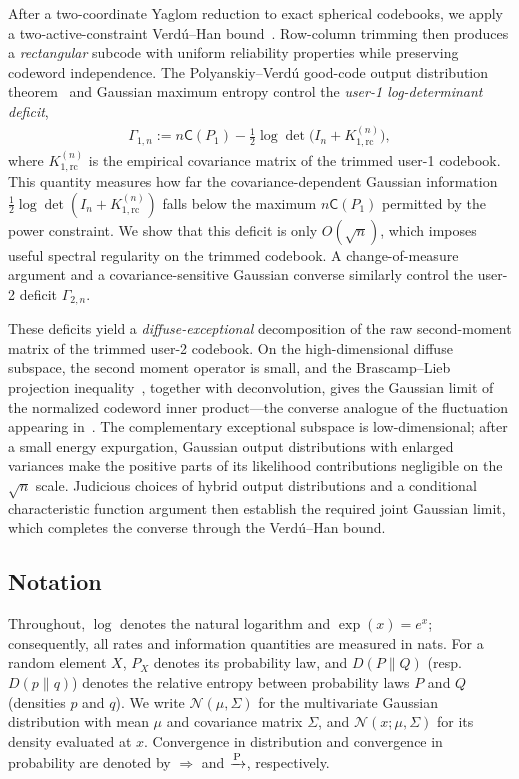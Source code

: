\documentclass[11pt,onecolumn]{IEEEtran}
\newcommand{\calN}{\mathcal{N}}
\newcommand{\rvC}{\mathsf{C}}
\newcommand{\rc}{\mathrm{rc}}
\begin{document}
After a two-coordinate Yaglom reduction to exact spherical codebooks, we
apply a two-active-constraint Verd\'u--Han bound~\cite{VH94,Han98}.
Row-column trimming then produces a {\em rectangular} subcode with uniform
reliability properties while preserving codeword independence. The
Polyanskiy--Verd\'u good-code output  distribution theorem~\cite{PolVerdu14} and Gaussian maximum entropy control the {\em user-1 log-determinant deficit}, \begin{align}
\Gamma_{1,n}
:=
n\rvC(P_1)
-\frac{1}{2}\log\det\bigl(I_n+K_{1,\rc}^{(n)}\bigr),
\end{align}
where \(K_{1,\rc}^{(n)}\) is the empirical covariance matrix of the trimmed
user-1 codebook. This quantity measures how far the covariance-dependent
Gaussian information
\(\frac12\log\det(I_n+K_{1,\rc}^{(n)})\) falls below the maximum
\(n\rvC(P_1)\) permitted by the power constraint. We show that this deficit
is only \(O(\sqrt n)\), which imposes useful spectral regularity on the
trimmed codebook. A change-of-measure
argument and a covariance-sensitive Gaussian converse similarly control the
user-2 deficit $\Gamma_{2,n}$. %

These deficits yield a {\em  diffuse-exceptional} decomposition of the raw
second-moment matrix of the trimmed user-2 codebook. On the high-dimensional
diffuse subspace, the second moment operator is small, and the
Brascamp--Lieb projection inequality~\cite{CarlenCorderoErausquin2009},
together with deconvolution, gives the Gaussian limit of the normalized
codeword inner product—the converse analogue of the fluctuation appearing
in~\cite{yavas21}. The complementary exceptional subspace is
low-dimensional; after a small energy expurgation, Gaussian output distributions with
enlarged variances make the positive parts of its likelihood contributions
negligible on the $\sqrt n$ scale. Judicious choices of hybrid  output distributions and
a conditional characteristic function argument then establish the required
joint Gaussian limit, which completes the converse through the
Verd\'u--Han bound.


\subsection{Notation}   Throughout, $\log$ denotes the natural logarithm and $\exp(x)=e^x$; consequently, all rates and information quantities are measured in nats. For a random element $X$, $P_X$ denotes its probability law, and $D(P\|Q)$ (resp.\ $D(p\|q)$) denotes the relative entropy between probability laws $P$ and $Q$ (densities $p$ and $q$). We write $\calN(\mu,\Sigma)$ for the multivariate Gaussian distribution with mean $\mu$ and covariance matrix $\Sigma$, and $\calN(x;\mu,\Sigma)$ for its density evaluated at $x$. Convergence in distribution and convergence in probability are denoted by $\Rightarrow$ and $\xrightarrow{\rm P}$, respectively.
\end{document}
